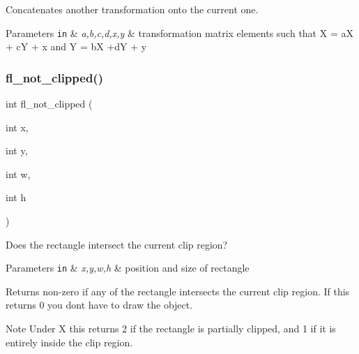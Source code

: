Concatenates another transformation onto the current one.


\begin{DoxyParams}[1]{Parameters}
\mbox{\tt in}  & {\em a,b,c,d,x,y} & transformation matrix elements such that {\ttfamily  X\textquotesingle{} = aX + cY + x } and {\ttfamily  Y\textquotesingle{} = bX +dY + y } \\
\hline
\end{DoxyParams}
\mbox{\label{group__fl__drawings_ga2bd899d466196ffc26cc61542ee10539}} 
\subsubsection{\texorpdfstring{fl\+\_\+not\+\_\+clipped()}{fl\_not\_clipped()}}
{\footnotesize\ttfamily int fl\+\_\+not\+\_\+clipped (\begin{DoxyParamCaption}\item[{int}]{x,  }\item[{int}]{y,  }\item[{int}]{w,  }\item[{int}]{h }\end{DoxyParamCaption})\hspace{0.3cm}{\ttfamily [inline]}}

Does the rectangle intersect the current clip region? 
\begin{DoxyParams}[1]{Parameters}
\mbox{\tt in}  & {\em x,y,w,h} & position and size of rectangle \\
\hline
\end{DoxyParams}
\begin{DoxyReturn}{Returns}
non-\/zero if any of the rectangle intersects the current clip region. If this returns 0 you don\textquotesingle{}t have to draw the object.
\end{DoxyReturn}
\begin{DoxyNote}{Note}
Under X this returns 2 if the rectangle is partially clipped, and 1 if it is entirely inside the clip region. 
\end{DoxyNote}
\mbox{\label{group__fl__drawings_ga6f6f1aea3b90a03c1714336e7aef349d}} 
